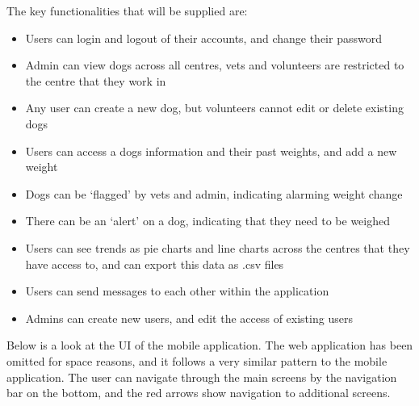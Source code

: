 The key functionalities that will be supplied are:
\begin{itemize}
  \item Users can login and logout of their accounts, and change their password
  \item Admin can view dogs across all centres, vets and volunteers are restricted to the centre that they work in
  \item Any user can create a new dog, but volunteers cannot edit or delete existing dogs
  \item Users can access a dogs information and their past weights, and add a new weight
  \item Dogs can be ‘flagged’ by vets and admin, indicating alarming weight change
  \item There can be an ‘alert’ on a dog, indicating that they need to be weighed
  \item Users can see trends as pie charts and line charts across the centres that they have access to, and can export this data as .csv files
  \item Users can send messages to each other within the application
  \item Admins can create new users, and edit the access of existing users
 \end{itemize}
 
 Below is a look at the UI of the mobile application. The web application has been omitted for space reasons, and it follows a very similar pattern to the mobile application. The user can navigate through the main screens by the navigation bar on the bottom, and the red arrows show navigation to additional screens. 
 


